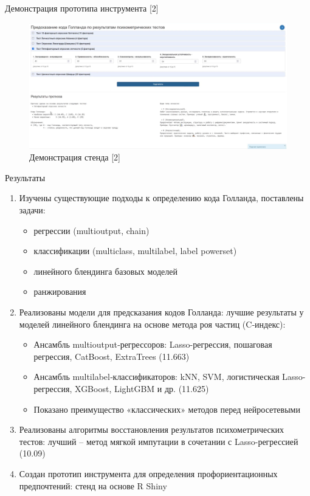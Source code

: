\documentclass[english,russian, 10pt]{beamer}
\begin{document}
\begin{frame}{Демонстрация прототипа инструмента [2]}
    \begin{figure}
        \centering
        \includegraphics[width=0.95\linewidth]{images/UI2.png}
        \caption{Демонстрация стенда [2]}
        \label{fig:ui2}
    \end{figure}
\end{frame}


\begin{frame}{Результаты}
  \begin{enumerate}
    \item Изучены существующие подходы к определению кода Голланда, поставлены задачи:
      \begin{itemize}
        \item регрессии (multioutput, chain)
        \item классификации (multiclass, multilabel, label powerset)
        \item линейного блендинга базовых моделей
        \item ранжирования
      \end{itemize}
    \item Реализованы модели для предсказания кодов Голланда: лучшие результаты у моделей линейного блендинга на основе метода роя частиц (C‑индекс):
      \begin{itemize}
        \item Ансамбль multioutput‑регрессоров: Lasso-регрессия, пошаговая регрессия, CatBoost, ExtraTrees (11.663)
        \item Ансамбль multilabel‑классификаторов: kNN, SVM, логистическая Lasso-регрессия, XGBoost, LightGBM и др. (11.625)
        \item Показано преимущество «классических» методов перед нейросетевыми
      \end{itemize}
    \item Реализованы алгоритмы восстановления результатов психометрических тестов: лучший – метод мягкой импутации в сочетании с Lasso-регрессией (10.09)
    \item Создан прототип инструмента для определения профориентационных предпочтений: стенд на основе R Shiny
  \end{enumerate}
\end{frame}


\begin{frame}[plain]
    \titlepage
\end{frame}
\end{document}

